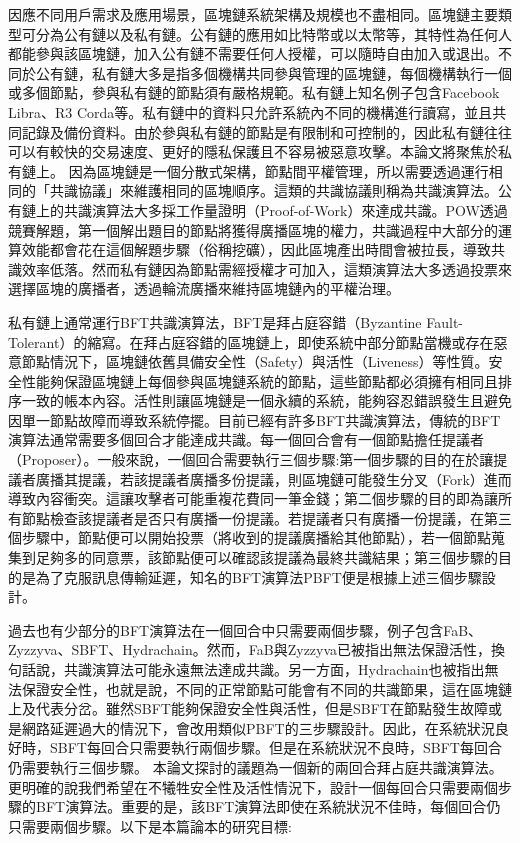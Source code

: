 因應不同用戶需求及應用場景，區塊鏈系統架構及規模也不盡相同。區塊鏈主要類型可分為公有鏈以及私有鏈。公有鏈的應用如比特幣\cite{Bitcoin}或以太幣\cite{Ethereum}等，其特性為任何人都能參與該區塊鏈，加入公有鏈不需要任何人授權，可以隨時自由加入或退出。不同於公有鏈，私有鏈大多是指多個機構共同參與管理的區塊鏈，每個機構執行一個或多個節點，參與私有鏈的節點須有嚴格規範。私有鏈上知名例子包含Facebook Libra\cite{STEVE_HANNA2010}、R3 Corda\cite{R3}等。私有鏈中的資料只允許系統內不同的機構進行讀寫，並且共同記錄及備份資料。由於參與私有鏈的節點是有限制和可控制的，因此私有鏈往往可以有較快的交易速度、更好的隱私保護且不容易被惡意攻擊。本論文將聚焦於私有鏈上。
因為區塊鏈是一個分散式架構，節點間平權管理，所以需要透過運行相同的「共識協議」來維護相同的區塊順序。這類的共識協議則稱為共識演算法。公有鏈上的共識演算法大多採工作量證明（Proof-of-Work）來達成共識。POW透過競賽解題，第一個解出題目的節點將獲得廣播區塊的權力，共識過程中大部分的運算效能都會花在這個解題步驟（俗稱挖礦），因此區塊產出時間會被拉長，導致共識效率低落。然而私有鏈因為節點需經授權才可加入，這類演算法大多透過投票來選擇區塊的廣播者，透過輪流廣播來維持區塊鏈內的平權治理。

私有鏈上通常運行BFT共識演算法，BFT是拜占庭容錯（Byzantine Fault-Tolerant）的縮寫。在拜占庭容錯的區塊鏈上，即使系統中部分節點當機或存在惡意節點情況下，區塊鏈依舊具備安全性（Safety）與活性（Liveness）等性質。安全性能夠保證區塊鏈上每個參與區塊鏈系統的節點，這些節點都必須擁有相同且排序一致的帳本內容。活性則讓區塊鏈是一個永續的系統，能夠容忍錯誤發生且避免因單一節點故障而導致系統停擺。目前已經有許多BFT共識演算法，傳統的BFT演算法通常需要多個回合才能達成共識。每一個回合會有一個節點擔任提議者（Proposer）。一般來說，一個回合需要執行三個步驟:第一個步驟的目的在於讓提議者廣播其提議，若該提議者廣播多份提議，則區塊鏈可能發生分叉（Fork）進而導致內容衝突。這讓攻擊者可能重複花費同一筆金錢；第二個步驟的目的即為讓所有節點檢查該提議者是否只有廣播一份提議。若提議者只有廣播一份提議，在第三個步驟中，節點便可以開始投票（將收到的提議廣播給其他節點），若一個節點蒐集到足夠多的同意票，該節點便可以確認該提議為最終共識結果；第三個步驟的目的是為了克服訊息傳輸延遲，知名的BFT演算法PBFT\cite{castro1999practical}便是根據上述三個步驟設計。

過去也有少部分的BFT演算法在一個回合中只需要兩個步驟，例子包含FaB\cite{abraham2018revisiting}、Zyzzyva\cite{kotla2007zyzzyva}、SBFT\cite{martin2006fast}、Hydrachain\cite{Hydrachain}。然而，FaB與Zyzzyva已被指出無法保證活性，換句話說，共識演算法可能永遠無法達成共識。另一方面，Hydrachain也被指出無法保證安全性，也就是說，不同的正常節點可能會有不同的共識節果，這在區塊鏈上及代表分岔。雖然SBFT能夠保證安全性與活性，但是SBFT在節點發生故障或是網路延遲過大的情況下，會改用類似PBFT的三步驟設計。因此，在系統狀況良好時，SBFT每回合只需要執行兩個步驟。但是在系統狀況不良時，SBFT每回合仍需要執行三個步驟。
本論文探討的議題為一個新的兩回合拜占庭共識演算法。更明確的說我們希望在不犧牲安全性及活性情況下，設計一個每回合只需要兩個步驟的BFT演算法。重要的是，該BFT演算法即使在系統狀況不佳時，每個回合仍只需要兩個步驟。以下是本篇論本的研究目標: 

